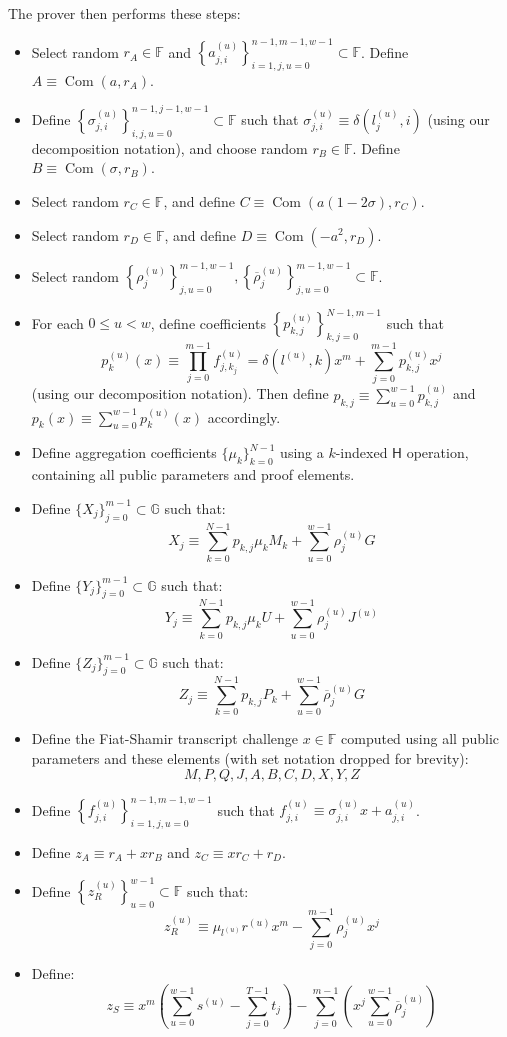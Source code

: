 \documentclass[draft]{article}
\newcommand{\G}{\mathbb{G}}
\newcommand{\F}{\mathbb{F}}
\newcommand{\hs}{\mathsf{H}}
\newcommand{\com}{\operatorname{Com}}
\newcommand{\sumj}{\sum_{j=0}^{m-1}}
\newcommand{\sumk}{\sum_{k=0}^{N-1}}
\newcommand{\sumu}{\sum_{u=0}^{w-1}}
\begin{document}
The prover then performs these steps:
\begin{itemize}
\item Select random $r_A \in \F$ and $\left\{a^{(u)}_{j,i}\right\}_{i=1,j,u=0}^{n-1,m-1,w-1} \subset \F$.
Define $A \equiv \com(a,r_A)$.
\item Define $\left\{\sigma^{(u)}_{j,i}\right\}_{i,j,u=0}^{n-1,j-1,w-1} \subset \F$ such that $\sigma^{(u)}_{j,i} \equiv \delta\left(l^{(u)}_j,i\right)$ (using our decomposition notation), and choose random $r_B \in \F$.
Define $B \equiv \com(\sigma,r_B)$.
\item Select random $r_C \in \F$, and define $C \equiv \com(a(1-2\sigma), r_C)$.
\item Select random $r_D \in \F$, and define $D \equiv \com(-a^2, r_D)$.
\item Select random $\left\{\rho^{(u)}_j\right\}_{j,u=0}^{m-1,w-1}, \left\{\overline{\rho}^{(u)}_j\right\}_{j,u=0}^{m-1,w-1} \subset \F$.
\item For each $0 \leq u < w$, define coefficients $\left\{p^{(u)}_{k,j}\right\}_{k,j=0}^{N-1,m-1}$ such that $$p^{(u)}_k(x) \equiv \prod_{j=0}^{m-1} f^{(u)}_{j,k_j} = \delta\left(l^{(u)},k\right)x^m + \sumj p^{(u)}_{k,j}x^j$$ (using our decomposition notation).
Then define $p_{k,j} \equiv \sumu p^{(u)}_{k,j}$ and $p_k(x) \equiv \sumu p^{(u)}_k(x)$ accordingly.
\item Define aggregation coefficients $\{\mu_k\}_{k=0}^{N-1}$ using a $k$-indexed $\hs$ operation, containing all public parameters and proof elements.
\item Define $\{X_j\}_{j=0}^{m-1} \subset \G$ such that: $$X_j \equiv \sumk p_{k,j}\mu_kM_k + \sumu \rho^{(u)}_jG$$
\item Define $\{Y_j\}_{j=0}^{m-1} \subset \G$ such that: $$Y_j \equiv \sumk p_{k,j}\mu_kU + \sumu \rho^{(u)}_jJ^{(u)}$$
\item Define $\{Z_j\}_{j=0}^{m-1} \subset \G$ such that: $$Z_j \equiv \sumk p_{k,j}P_k + \sumu \overline{\rho}^{(u)}_jG$$
\item Define the Fiat-Shamir transcript challenge $x \in \F$ computed using all public parameters and these elements (with set notation dropped for brevity): $$M,P,Q,J,A,B,C,D,X,Y,Z$$
\item Define $\left\{f^{(u)}_{j,i}\right\}_{i=1,j,u=0}^{n-1,m-1,w-1}$ such that $f^{(u)}_{j,i} \equiv \sigma^{(u)}_{j,i}x + a^{(u)}_{j,i}$.
\item Define $z_A \equiv r_A + xr_B$ and $z_C \equiv xr_C + r_D$.
\item Define $\left\{z^{(u)}_R\right\}_{u=0}^{w-1} \subset \F$ such that: $$z^{(u)}_R \equiv \mu_{l^{(u)}}r^{(u)}x^m - \sumj \rho^{(u)}_jx^j$$
\item Define: $$z_S \equiv x^m\left( \sumu s^{(u)} - \sum_{j=0}^{T-1} t_j \right) - \sumj \left(x^j \sumu \overline{\rho}^{(u)}_j\right)$$
\end{itemize}
\end{document}
